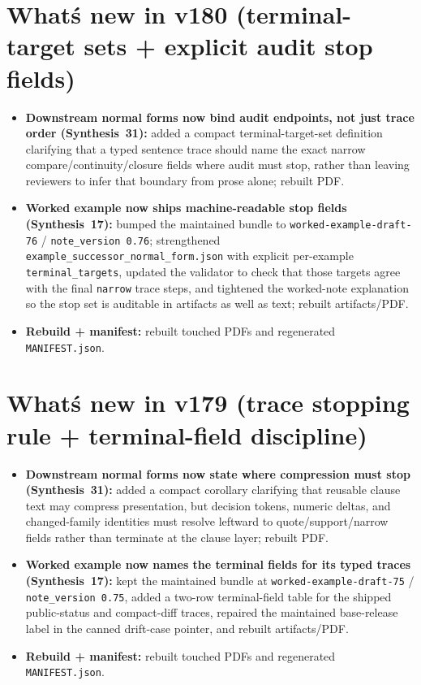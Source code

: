 \documentclass[11pt]{article}
\begin{document}
\section{What\'s new in v180 (terminal-target sets + explicit audit stop fields)}
\begin{itemize}[leftmargin=*]
\item \textbf{Downstream normal forms now bind audit endpoints, not just trace order (Synthesis~31):} added a compact terminal-target-set definition clarifying that a typed sentence trace should name the exact narrow compare/continuity/closure fields where audit must stop, rather than leaving reviewers to infer that boundary from prose alone; rebuilt PDF.
\item \textbf{Worked example now ships machine-readable stop fields (Synthesis~17):} bumped the maintained bundle to \texttt{worked-example-draft-76} / \texttt{note\_version 0.76}; strengthened \texttt{example\_successor\_normal\_form.json} with explicit per-example \texttt{terminal\_targets}, updated the validator to check that those targets agree with the final \texttt{narrow} trace steps, and tightened the worked-note explanation so the stop set is auditable in artifacts as well as text; rebuilt artifacts/PDF.
\item \textbf{Rebuild + manifest:} rebuilt touched PDFs and regenerated \texttt{MANIFEST.json}.
\end{itemize}

\section{What\'s new in v179 (trace stopping rule + terminal-field discipline)}
\begin{itemize}[leftmargin=*]
\item \textbf{Downstream normal forms now state where compression must stop (Synthesis~31):} added a compact corollary clarifying that reusable clause text may compress presentation, but decision tokens, numeric deltas, and changed-family identities must resolve leftward to quote/support/narrow fields rather than terminate at the clause layer; rebuilt PDF.
\item \textbf{Worked example now names the terminal fields for its typed traces (Synthesis~17):} kept the maintained bundle at \texttt{worked-example-draft-75} / \texttt{note\_version 0.75}, added a two-row terminal-field table for the shipped public-status and compact-diff traces, repaired the maintained base-release label in the canned drift-case pointer, and rebuilt artifacts/PDF.
\item \textbf{Rebuild + manifest:} rebuilt touched PDFs and regenerated \texttt{MANIFEST.json}.
\end{itemize}
\end{document}
